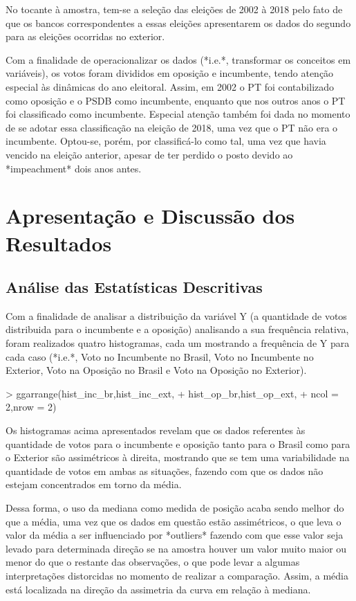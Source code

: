 \documentclass{article}
\begin{document}
No tocante à amostra, tem-se a seleção das eleições de 2002 à 2018 pelo fato de que os bancos correspondentes a essas eleições apresentarem os dados do segundo para as eleições ocorridas no exterior.

Com a finalidade de operacionalizar os dados (*i.e.*, transformar os conceitos em variáveis), os votos foram divididos em oposição e incumbente, tendo atenção especial às dinâmicas do ano eleitoral. Assim, em 2002 o PT foi contabilizado como oposição e o PSDB como incumbente, enquanto que nos outros anos o PT foi classificado como incumbente. Especial atenção também foi dada no momento de se adotar essa classificação na eleição de 2018, uma vez que o PT não era o incumbente. Optou-se, porém, por classificá-lo como tal, uma vez que havia vencido na eleição anterior, apesar de ter perdido o posto devido ao *impeachment* dois anos antes.

\section{Apresentação e Discussão dos Resultados}

\subsection{Análise das Estatísticas Descritivas}

Com a finalidade de analisar a distribuição da variável Y (a quantidade de votos distribuida para o incumbente e a oposição) analisando a sua frequência relativa, foram realizados quatro histogramas, cada um mostrando a frequência de Y para cada caso (*i.e.*, Voto no Incumbente no Brasil, Voto no Incumbente no Exterior, Voto na Oposição no Brasil e Voto na Oposição no Exterior).

\begin{Schunk}
\begin{Sinput}
> ggarrange(hist_inc_br,hist_inc_ext,
+           hist_op_br,hist_op_ext,
+           ncol = 2,nrow = 2)
\end{Sinput}
\end{Schunk}

Os histogramas acima apresentados revelam que os dados referentes às quantidade de votos para o incumbente e oposição tanto para o Brasil como para o Exterior são assimétricos à direita, mostrando que se tem uma variabilidade na quantidade de votos em ambas as situações, fazendo com que os dados não estejam concentrados em torno da média.

Dessa forma, o uso da mediana como medida de posição acaba sendo melhor do que a média, uma vez que os dados em questão estão assimétricos, o que leva o valor da média a ser influenciado por *outliers* fazendo com que esse valor seja levado para determinada direção se na amostra houver um valor muito maior ou menor do que o restante das observações, o que pode levar a algumas interpretações distorcidas no momento de realizar a comparação. Assim, a média está localizada na direção da assimetria da curva em relação à mediana.
\end{document}
